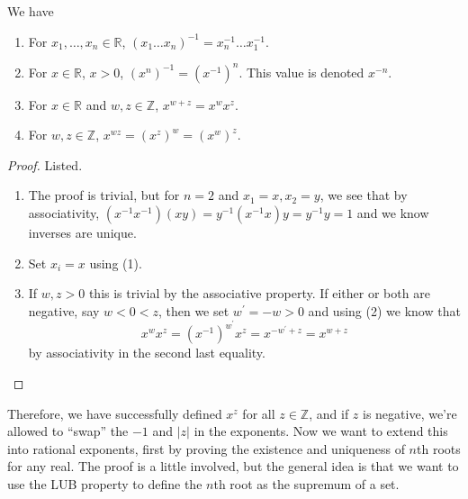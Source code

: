     \begin{lemma}
      We have 
      \begin{enumerate}
        \item For $x_1, \ldots, x_n \in \mathbb{R}$, $(x_1 \ldots x_n)^{-1} = x_n^{-1} \ldots x_1^{-1}$. 
        \item For $x \in \mathbb{R}$, $x > 0$, $(x^n)^{-1} = (x^{-1})^n$. This value is denoted $x^{-n}$. 
        \item For $x \in \mathbb{R}$ and $w, z \in \mathbb{Z}$, $x^{w + z} = x^w x^z$. 
        \item For $w, z \in \mathbb{Z}$, $x^{wz} = (x^z)^w = (x^w)^z$. 
      \end{enumerate}
    \end{lemma}
    \begin{proof}
      Listed. 
      \begin{enumerate}
        \item The proof is trivial, but for $n = 2$ and $x_1 = x, x_2 = y$, we see that by associativity, $(x^{-1} x^{-1}) (x y) = y^{-1} (x^{-1} x) y = y^{-1} y = 1$ and we know inverses are unique. 
        \item Set $x_i = x$ using (1). 
        \item If $w, z > 0$ this is trivial by the associative property. If either or both are negative, say $w < 0 < z$, then we set $w^\prime = -w > 0$ and using (2) we know that 
        \begin{equation}
          x^{w} x^{z} = (x^{-1})^{w^\prime} x^z = x^{-w^\prime + z} = x^{w + z}
        \end{equation}
        by associativity in the second last equality. 
      \end{enumerate}
    \end{proof}

    Therefore, we have successfully defined $x^z$ for all $z \in \mathbb{Z}$, and if $z$ is negative, we're allowed to ``swap'' the $-1$ and $|z|$ in the exponents. Now we want to extend this into rational exponents, first by proving the existence and uniqueness of $n$th roots for any real. The proof is a little involved, but the general idea is that we want to use the LUB property to define the $n$th root as the supremum of a set.  

